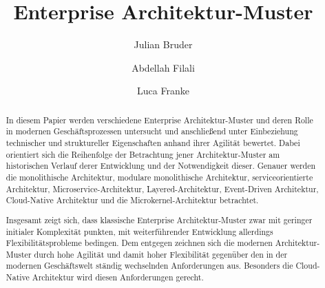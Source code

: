 \documentclass[acmtog]{acmart}
\begin{document}
\title{Enterprise Architektur-Muster}

\author{Julian Bruder}
\author{Abdellah Filali}
\authornotemark[1]
\author{Luca Franke}
\authornotemark[1]
\renewcommand{\shortauthors}{Bruder, Filali, Franke}

\begin{abstract}
In diesem Papier werden verschiedene Enterprise Architektur-Muster und deren Rolle in modernen Geschäftsprozessen untersucht
und anschließend unter Einbeziehung technischer und struktureller Eigenschaften anhand ihrer Agilität bewertet.
Dabei orientiert sich die Reihenfolge der Betrachtung jener Architektur-Muster am historischen Verlauf derer Entwicklung und der Notwendigkeit dieser.
Genauer werden die monolithische Architektur, modulare monolithische Architektur, serviceorientierte Architektur, Microservice-Architektur, Layered-Architektur,
Event-Driven Architektur, Cloud-Native Architektur und die Microkernel-Architektur betrachtet.

Insgesamt zeigt sich, dass klassische Enterprise Architektur-Muster zwar mit geringer initialer Komplexität punkten,
mit weiterführender Entwicklung allerdings Flexibilitätsprobleme bedingen.
Dem entgegen zeichnen sich die modernen Architektur-Muster durch hohe Agilität und damit hoher Flexibilität gegenüber den in der modernen Geschäftswelt ständig
wechselnden Anforderungen aus.
Besonders die Cloud-Native Architektur wird diesen Anforderungen gerecht.
\end{abstract}
\end{document}
